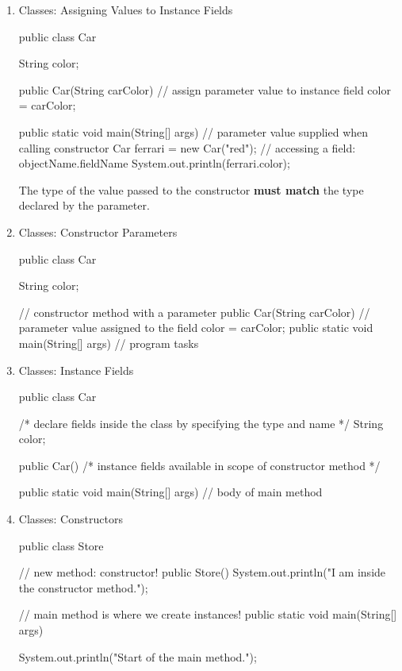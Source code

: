 \documentclass[a4paper,12pt]{article}
\begin{document}
\fontsize{14pt}{15.6pt}
\selectfont

\begin{enumerate}

\item Classes: Assigning Values to Instance Fields
\begin{javacode}
public class Car {
  String color;

  public Car(String carColor) {
    // assign parameter value to instance field
    color = carColor;
  }

  public static void main(String[] args) {
    // parameter value supplied when calling constructor
    Car ferrari = new Car("red");
		// accessing a field: objectName.fieldName
    System.out.println(ferrari.color);
  }
}
\end{javacode}
The type of the value passed to the constructor \textbf{must match} the type declared by the parameter.

\item Classes: Constructor Parameters
\begin{javacode}
public class Car {
  String color;

  // constructor method with a parameter
  public Car(String carColor) {
    // parameter value assigned to the field
    color = carColor;
  }
  public static void main(String[] args) {
    // program tasks
  }
}
\end{javacode}

\item Classes: Instance Fields
\begin{javacode}
public class Car {
  /*
  declare fields inside the class
  by specifying the type and name
  */
  String color;

  public Car() {
    /* 
    instance fields available in
    scope of constructor method
    */
  }

  public static void main(String[] args) {
    // body of main method
  }
}
\end{javacode}

\item Classes: Constructors
\begin{javacode}
public class Store {
  
  // new method: constructor!
  public Store() {
    System.out.println("I am inside the constructor method.");
  }
  
  // main method is where we create instances!
  public static void main(String[] args) {
    System.out.println("Start of the main method.");
    
}}
\end{javacode}
\end{enumerate}
\end{document}
